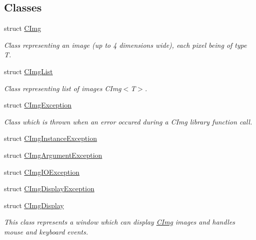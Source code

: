 \subsection*{Classes}
\begin{DoxyCompactItemize}
\item 
struct \hyperlink{structcimg__library_1_1_c_img}{C\-Img}
\begin{DoxyCompactList}\small\item\em Class representing an image (up to 4 dimensions wide), each pixel being of type {\ttfamily T}. \end{DoxyCompactList}\item 
struct \hyperlink{structcimg__library_1_1_c_img_list}{C\-Img\-List}
\begin{DoxyCompactList}\small\item\em Class representing list of images C\-Img$<$\-T$>$. \end{DoxyCompactList}\item 
struct \hyperlink{structcimg__library_1_1_c_img_exception}{C\-Img\-Exception}
\begin{DoxyCompactList}\small\item\em Class which is thrown when an error occured during a C\-Img library function call. \end{DoxyCompactList}\item 
struct \hyperlink{structcimg__library_1_1_c_img_instance_exception}{C\-Img\-Instance\-Exception}
\item 
struct \hyperlink{structcimg__library_1_1_c_img_argument_exception}{C\-Img\-Argument\-Exception}
\item 
struct \hyperlink{structcimg__library_1_1_c_img_i_o_exception}{C\-Img\-I\-O\-Exception}
\item 
struct \hyperlink{structcimg__library_1_1_c_img_display_exception}{C\-Img\-Display\-Exception}
\item 
struct \hyperlink{structcimg__library_1_1_c_img_display}{C\-Img\-Display}
\begin{DoxyCompactList}\small\item\em This class represents a window which can display \hyperlink{structcimg__library_1_1_c_img}{C\-Img} images and handles mouse and keyboard events. \end{DoxyCompactList}\end{DoxyCompactItemize}
